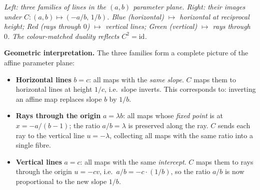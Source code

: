 \documentclass[11pt,a4paper]{article}
\begin{document}
\begin{center}
\end{center}

\begin{center}
\small\textit{Left: three families of lines in the $(a,b)$ parameter plane.
Right: their images under $C:(a,b)\mapsto(-a/b,\,1/b)$.
\textcolor{blue!70!black}{Blue} (horizontal) $\mapsto$ \textcolor{blue!70!black}{horizontal} at reciprocal height;\;
\textcolor{red!80!black}{Red} (rays through $0$) $\mapsto$ \textcolor{red!80!black}{vertical} lines;\;
\textcolor{green!60!black}{Green} (vertical) $\mapsto$ \textcolor{green!60!black}{rays through $0$}.
The colour-matched duality reflects $C^2=\mathrm{id}$.}
\end{center}

\medskip\noindent\textbf{Geometric interpretation.}
The three families form a complete picture of the affine parameter plane:
\begin{itemize}
\item \textbf{Horizontal lines} $b=c$: all maps with the \emph{same slope}.
  $C$ maps them to horizontal lines at height $1/c$, i.e.\ slope inverts.
  This corresponds to: inverting an affine map replaces slope $b$ by $1/b$.
\item \textbf{Rays through the origin} $a=\lambda b$: all maps whose
  \emph{fixed point} is at $x=-a/(b-1)$; the ratio $a/b=\lambda$ is preserved along the ray.
  $C$ sends each ray to the vertical line $u=-\lambda$, collecting all maps
  with the same ratio into a single fibre.
\item \textbf{Vertical lines} $a=c$: all maps with the same \emph{intercept}.
  $C$ maps them to rays through the origin $u=-cv$, i.e.\ $a/b = -c\cdot(1/b)$, so the ratio
  $a/b$ is now proportional to the new slope $1/b$.
\end{itemize}
\end{document}
